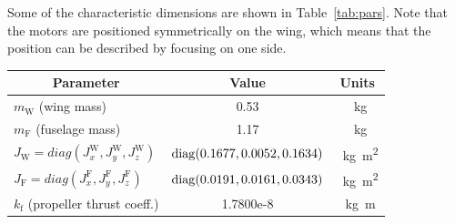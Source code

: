 Some of the characteristic dimensions are shown in Table~\ref{tab:pars}. Note that the motors are positioned symmetrically on the wing, which means that the position can be described by focusing on one side. 
\begin{table}[ht]
  \centering
    \begin{tabular}{|l|c|c|}
      \hline
      \multicolumn{1}{|c|}{Parameter} & Value & Units  \\
      \hline
      $m_{\text{W}}$ (wing mass)  & 0.53& \SI{}{\kilogram} \\
      \hline
      $m_{\text{F}}$ (fuselage mass)  & 1.17& \SI{}{\kilogram} \\
      \hline
      $J_{\text{W}}=diag(J_{x}^{\text{W}}, J_{y}^{\text{W}}, J_{z}^{\text{W}})$ & \!\! $\operatorname{diag}(0.1677,0.0052,0.1634)$\!\! & \SI{}{\kilogram\square\meter}\\
      \hline
      $J_{\text{F}}=diag(J_{x}^{\text{F}}, J_{y}^{\text{F}}, J_{z}^{\text{F}})$ & \!\! $\operatorname{diag}(0.0191,0.0161,0.0343)$\!\! & \SI{}{\kilogram\square\meter}\\
      \hline
      $k_{\text{f}}$ (propeller thrust coeff.) & 1.7800e-8 & \SI{}{\kilogram\meter}\\
      \hline

\end{tabular}
\end{table}
